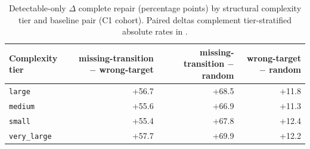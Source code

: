 \begin{table}[t]
\caption{Detectable-only $\Delta$ complete repair (percentage points) by structural complexity tier and baseline pair (C1 cohort). Paired deltas complement tier-stratified absolute rates in .}
\label{tab:baseline-delta-by-tier}
\begin{tabular}{@{}lrrr@{}}
\toprule
Complexity tier & missing-transition $-$ wrong-target & missing-transition $-$ random & wrong-target $-$ random \\
\midrule
\texttt{large} & +56.7 & +68.5 & +11.8 \\
\texttt{medium} & +55.6 & +66.9 & +11.3 \\
\texttt{small} & +55.4 & +67.8 & +12.4 \\
\texttt{very\_large} & +57.7 & +69.9 & +12.2 \\
\bottomrule
\end{tabular}
\end{table}
